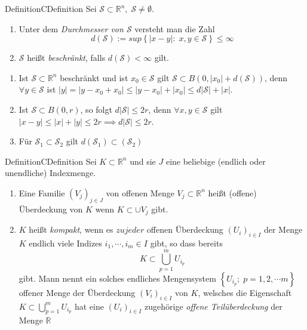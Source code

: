 \documentclass[a4paper]{memoir}
\begin{document}

\begin{ibox}[]{Definition}{CDefinition}
    Sei $ \mathcal{S} \subset \mathbb{R}^n , \; \mathcal{S} \neq \emptyset. $ 
	\begin{enumerate}[label=\alph*)]
		\item Unter dem \textit{Durchmesser von $ \mathcal{S}  $ } versteht man die Zahl 
			$$ d \left( \mathcal{S}  \right) := sup \left\{ \left| x-y \right| : \; x,y \in \mathcal{S}  \right\} \leq \infty $$
		\item $ \mathcal{S}  $ heißt \textit{beschränkt}, falls $ d \left( \mathcal{S}  \right) < \infty $ gilt.
	\end{enumerate}
\end{ibox}

\begin{enumerate}[label=\alph*)]
	\item Ist $ \mathcal{S} \subset  \mathbb{R}^n  $ beschränkt und ist $ x_0 \in \mathcal{S}  $   gilt $ \mathcal{S} \subset 
		B \left( 0, \left| x_0 \right| + d( \mathcal{S} ) \right)  $, denn $ \forall  y \in \mathcal{S}  $ ist $ |y| = 
		\left| y -x_0 + x_0 \right| \leq \left| y-x_0 \right| + \left| x_0 \right| \leq d \left| \mathcal{S}  \right| + |x|$. 
	\item Ist $ \mathcal{S} \subset B(0,r) $, so folgt $  d \left| \mathcal{S}  \right| \leq 2r $, denn $ \forall x,y \in \mathcal{S}  $ 
		gilt $ \left| x-y \right| \leq |x| + |y| \leq 2r \implies  d \left| \mathcal{S}  \right| \leq 2r $.
	\item Für $ \mathcal{S}_1 \subset \mathcal{S}_2 $ gilt $d \left(  \mathcal{S}_1 \right)  \subset \left(  \mathcal{S}_2 \right) $ 
\end{enumerate}

\begin{ibox}[]{Definition}{CDefinition}
    Sei $ K \subset  \mathbb{R}^n  $ und sie $ J $ eine beliebige (endlich oder unendliche) Indexmenge.
	\begin{enumerate}[label=\alph*)]
		\item Eine Familie $ \left( V_j \right)_{j \in J} $ von offenen Menge $ V_{j} \subset  \mathbb{R}^n  $ heißt (offene)
			Überdeckung von $ K $ wenn $ K \subset  \cup V_{j}$ gibt.
		\item $ K $ heißt \textit{kompakt}, wenn es $ zu jeder $ offenen Überdeckung $ \left( U_{i} \right)_{i \in  I} $ der Menge
			$ K $ endlich viele Indizes $ i_1, \cdots , i_{m} \in  I $ gibt, so dass bereits 
			$$ K \subset  \bigcup_{p = 1}^{m} U_{i_{p}}  $$gibt. Mann nennt ein solches endliches Mengensystem 
			$ \left\{ U_{i_{p}}; \; p = 1,2, \cdots m \right\}  $ offener Menge der Überdeckung $ \left( V_{i} \right)_{i \in  I} $ 
			von $ K $, welsches die Eigenschaft $  K \subset  \bigcup_{p = 1}^{m} U_{i_{p}} $ hat eine $ \left( U_{i}\right)_{i \in  I}   $ 
			zugehörige \textit{offene Teilüberdeckung} der Menge $ \mathbb{R}  $ 
	\end{enumerate}
\end{ibox}
\end{document}
